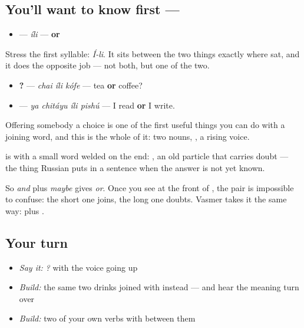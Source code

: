 \subsection*{You'll want to know first — }
\begin{itemize}
\raggedright
  \item \textbf{} — \emph{íli} — \textbf{or}
\end{itemize}

Stress the first syllable: \emph{Í-li}. It sits between the two things exactly where \textbf{} sat, and it does the opposite job — not both, but one of the two.

\begin{itemize}
\raggedright
  \item \textbf{  ?} — \emph{chai íli kófe} — tea \textbf{or} coffee?
  \item \textbf{   } — \emph{ya chitáyu íli pishú} — I read \textbf{or} I write.
\end{itemize}

Offering somebody a choice is one of the first useful things you can do with a joining word, and this is the whole of it: two nouns, \textbf{}, a rising voice.

\begin{cousinweb}
\textbf{} is \textbf{} with a small word welded on the end: \textbf{}, an old particle that carries doubt — the thing Russian puts in a sentence when the answer is not yet known.

So \emph{and} plus \emph{maybe} gives \emph{or}. Once you see \textbf{} at the front of \textbf{}, the pair is impossible to confuse: the short one joins, the long one doubts. Vasmer takes it the same way: \textbf{} plus \textbf{}.
\end{cousinweb}

\subsection*{Your turn}
\begin{itemize}
\raggedright
  \item \emph{Say it:} \emph{  ?} with the voice going up
  \item \emph{Build:} the same two drinks joined with \textbf{} instead — and hear the meaning turn over
  \item \emph{Build:} two of your own verbs with \textbf{} between them
\end{itemize}

